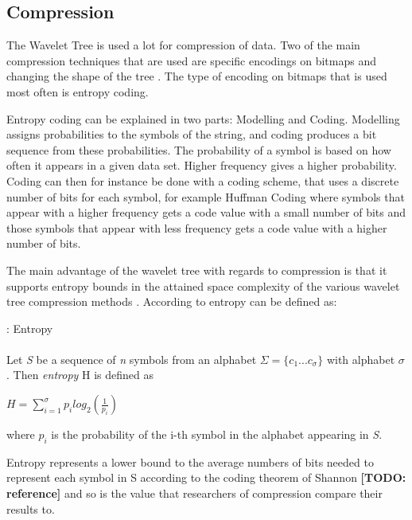 \subsection{Compression}
The Wavelet Tree is used a lot for compression of data. Two of the main compression techniques that are used are specific encodings on bitmaps and changing the shape of the tree \citep[Section~3]{Navjda13}.
The type of encoding on bitmaps that is used most often is entropy coding.

Entropy coding can be explained in two parts: Modelling and Coding.
Modelling assigns probabilities to the symbols of the string, and coding produces a bit sequence from these probabilities.
The probability of a symbol is based on how often it appears in a given data set. 
Higher frequency gives a higher probability.
Coding can then for instance be done with a coding scheme, that uses a discrete number of bits for each symbol, for example Huffman Coding \citep{HuffmanCoding} where symbols that appear with a higher frequency gets a code value with a small number of bits and those symbols that appear with less frequency gets a code value with a higher number of bits.

The main advantage of the wavelet tree with regards to compression is that it supports entropy bounds in the attained space complexity of the various wavelet tree compression methods \citep[Section~2.1]{WTSurvey}.
According to \citep[Section~1]{WTSurvey} entropy can be defined as:

\begin{mdframed}[nobreak, linecolor=lightgray, linewidth=2pt]
\begin{definition}: Entropy \\\\
Let \textit{S} be a sequence of \textit{n} symbols from an alphabet $\Sigma = \lbrace c_1 ... c_\sigma \rbrace$ with alphabet $\sigma$.
Then \textit{entropy} H is defined as
\begin{center}
$H = \sum_{i=1}^{\sigma} p_i log_2(\frac{1}{p_i})$
\end{center}
where $p_i$ is the probability of the i-th symbol in the alphabet appearing in \textit{S}.
\end{definition} 
\end{mdframed}

Entropy represents a lower bound to the average numbers of bits needed to represent each symbol in S according to the coding theorem of Shannon \textbf{[TODO: reference]} and so is the value that researchers of compression compare their results to.

